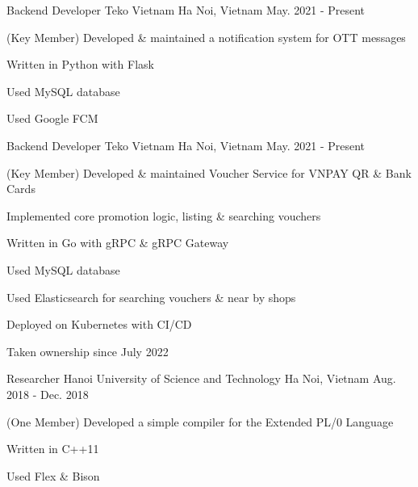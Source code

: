 \begin{cventries}
\cventry
{Backend Developer} %
{Teko Vietnam} %
{Ha Noi, Vietnam} %
{May. 2021 - Present} %
{ %
\begin{cvitems}
\item{(Key Member) Developed \& maintained a notification system for OTT messages}
\item{Written in Python with Flask}
\item{Used MySQL database}
\item{Used Google FCM}
\end{cvitems}
}


\cventry
{Backend Developer} %
{Teko Vietnam} %
{Ha Noi, Vietnam} %
{May. 2021 - Present} %
{ %
\begin{cvitems}
\item{(Key Member) Developed \& maintained Voucher Service for VNPAY QR \& Bank Cards}
\item{Implemented core promotion logic, listing \& searching vouchers}
\item{Written in Go with gRPC \& gRPC Gateway}
\item{Used MySQL database}
\item{Used Elasticsearch for searching vouchers \& near by shops}
\item{Deployed on Kubernetes with CI/CD}
\item{Taken ownership since July 2022}
\end{cvitems}
}


\cventry
{Researcher} %
{Hanoi University of Science and Technology} %
{Ha Noi, Vietnam} %
{Aug. 2018 - Dec. 2018} %
{ %
\begin{cvitems}
\item{(One Member) Developed a simple compiler for the Extended PL/0 Language}
\item{Written in C++11}
\item{Used Flex \& Bison}
\end{cvitems}
}


\end{cventries}
